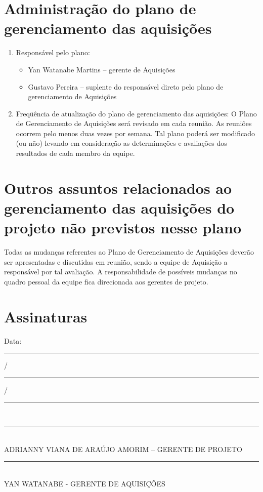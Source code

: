 \section{Administração do plano de gerenciamento das aquisições}
\begin{enumerate}
\item Responsável pelo plano:
\begin{itemize}
\item Yan Watanabe Martins – gerente de Aquisições
\item Gustavo Pereira – suplente do responsável direto pelo plano de gerenciamento de Aquisições
\end{itemize}
\item Freqüência de atualização do plano de gerenciamento das aquisições:
O Plano de Gerenciamento de Aquisições será revisado em cada reunião. As reuniões ocorrem pelo menos duas vezes por semana. Tal plano poderá ser modificado (ou não) levando em consideração as determinações e avaliações dos resultados de cada membro da equipe. 
\end{enumerate}

\section{Outros assuntos relacionados ao gerenciamento das aquisições do projeto não previstos nesse plano}
Todas as mudanças referentes ao Plano de Gerenciamento de Aquisições deverão ser apresentadas e discutidas em reunião, sendo a equipe de Aquisição a responsável por tal avaliação. A responsabilidade de possíveis mudanças no quadro pessoal da equipe fica direcionada aos gerentes de projeto.

\section{Assinaturas}
\begin{center}
Data: \rule{0.5cm}{0.1mm}/\rule{0.5cm}{0.1mm}/\rule{1cm}{0.1mm}     \\
\rule{13cm}{0.1mm}\\
ADRIANNY VIANA DE ARAÚJO AMORIM – GERENTE DE PROJETO\\
\rule{13cm}{0.1mm}\\
YAN WATANABE - GERENTE DE AQUISIÇÕES

\end{center}
% 